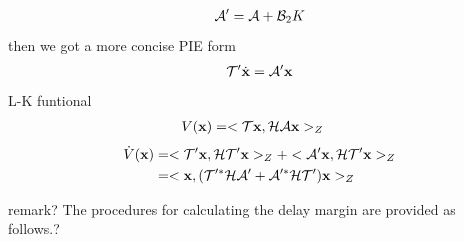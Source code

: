 \documentclass[twocolumn]{autart}    %
\begin{document}
\begin{pf}
    \begin{equation}
        \begin{aligned}
            \setlength{\arraycolsep}{0.9pt}
            \mathcal{A}' = \mathcal{A}+\mathcal{B}_{2}K
        \end{aligned}
    \end{equation}
    then we got a more concise PIE form
    \begin{equation}
        \begin{aligned}
            \setlength{\arraycolsep}{0.9pt}
            \mathcal{T}'\dot{\bold{x}} = \mathcal{A}'\bold{x}
        \end{aligned}
    \end{equation}
    L-K funtional 
    \begin{equation}
        \begin{aligned}
            \setlength{\arraycolsep}{0.9pt}
            V(\bold{x}) &= <\mathcal{T}\bold{x},\mathcal{H}\mathcal{A}\bold{x}>_{Z} 
        \end{aligned}
    \end{equation}
    \begin{equation}
        \begin{aligned}
            \setlength{\arraycolsep}{0.9pt}
            \dot{V}(\bold{x}) &= <\mathcal{T}'\bold{x},\mathcal{H}\mathcal{T}'\bold{x}>_{Z} + <\mathcal{A}'\bold{x},\mathcal{H}\mathcal{T}'\bold{x}>_{Z} \\ &=<\bold{x},(\mathcal{T}'^{*}\mathcal{H}\mathcal{A}'+\mathcal{A}'^{*}\mathcal{H}\mathcal{T}')\bold{x}>_{Z}  
        \end{aligned}
    \end{equation}
\end{pf}

remark?
The procedures for calculating the delay margin are provided as follows.?
\end{document}
